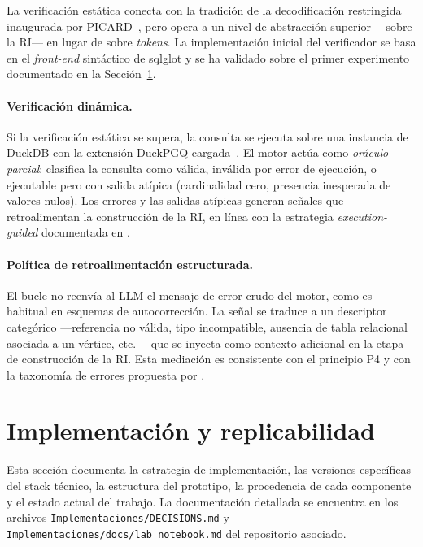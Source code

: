 La verificación estática conecta con la tradición de la decodificación restringida inaugurada por \textsc{PICARD}~\cite{PICARD2022}, pero opera a un nivel de abstracción superior ---sobre la \ac{RI}--- en lugar de sobre \emph{tokens}. La implementación inicial del verificador se basa en el \emph{front-end} sintáctico de sqlglot y se ha validado sobre el primer experimento documentado en la Sección~\ref{sec:prop-implementacion}.

\paragraph{Verificación dinámica.} Si la verificación estática se supera, la consulta se ejecuta sobre una instancia de DuckDB con la extensión DuckPGQ cargada~\cite{DuckPGQ}. El motor actúa como \emph{oráculo parcial}: clasifica la consulta como válida, inválida por error de ejecución, o ejecutable pero con salida atípica (cardinalidad cero, presencia inesperada de valores nulos). Los errores y las salidas atípicas generan señales que retroalimentan la construcción de la \ac{RI}, en línea con la estrategia \emph{execution-guided} documentada en \cite{CHESS2024, TS-SQL2025, SQLHD2025}.

\paragraph{Política de retroalimentación estructurada.} El bucle no reenvía al \ac{LLM} el mensaje de error crudo del motor, como es habitual en esquemas de autocorrección. La señal se traduce a un descriptor categórico ---referencia no válida, tipo incompatible, ausencia de tabla relacional asociada a un vértice, etc.--- que se inyecta como contexto adicional en la etapa de construcción de la \ac{RI}. Esta mediación es consistente con el principio P4 y con la taxonomía de errores propuesta por \cite{errorllm2026}.

\section{Implementación y replicabilidad}
\label{sec:prop-implementacion}

Esta sección documenta la estrategia de implementación, las versiones específicas del stack técnico, la estructura del prototipo, la procedencia de cada componente y el estado actual del trabajo. La documentación detallada se encuentra en los archivos \texttt{Implementaciones/DECISIONS.md} y \texttt{Implementaciones/docs/lab\_notebook.md} del repositorio asociado.


